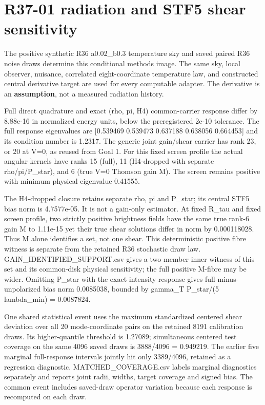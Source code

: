 \documentclass[
]{article}
\author{}
\date{}
\begin{document}
\hypertarget{r37-01-radiation-and-stf5-shear-sensitivity}{%
\section{R37-01 radiation and STF5 shear
sensitivity}\label{r37-01-radiation-and-stf5-shear-sensitivity}}

The positive synthetic R36 a0.02\_b0.3 temperature sky and saved paired
R36 noise draws determine this conditional methods image. The same sky,
local observer, nuisance, correlated eight-coordinate temperature law,
and constructed central derivative target are used for every computable
adapter. The derivative is an \textbf{assumption}, not a measured
radiation history.

Full direct quadrature and exact (rho, pi, H4) common-carrier response
differ by 8.88e-16 in normalized energy units, below the preregistered
2e-10 tolerance. The full response eigenvalues are {[}0.539469 0.539473
0.637188 0.638056 0.664453{]} and its condition number is 1.2317. The
generic joint gain/shear carrier has rank 23, or 20 at V=0, as reused
from Goal 1. For this fixed screen profile the actual angular kernels
have ranks 15 (full), 11 (H4-dropped with separate rho/pi/P\_star), and
6 (true V=0 Thomson gain M). The screen remains positive with minimum
physical eigenvalue 0.41555.

The H4-dropped closure retains separate rho, pi and P\_star; its central
STF5 bias norm is 4.7577e-05. It is not a gain-only estimator. At fixed
R\_tau and fixed screen profile, two strictly positive brightness fields
have the same true rank-6 gain M to 1.11e-15 yet their true shear
solutions differ in norm by 0.000118028. Thus M alone identifies a set,
not one shear. This deterministic positive fibre witness is separate
from the retained R36 stochastic draw law. GAIN\_IDENTIFIED\_SUPPORT.csv
gives a two-member inner witness of this set and its common-disk
physical sensitivity; the full positive M-fibre may be wider. Omitting
P\_star with the exact intensity response gives full-minus-unpolarized
bias norm 0.0085038, bounded by gamma\_T
\textbar\textbar P\_star\textbar\textbar/(5 lambda\_min) = 0.0087824.

One shared statistical event uses the maximum standardized centered
shear deviation over all 20 mode-coordinate pairs on the retained 8191
calibration draws. Its higher-quantile threshold is 1.27089;
simultaneous centered test coverage on the same 4096 saved draws is
3888/4096 = 0.949219. The earlier five marginal full-response intervals
jointly hit only 3389/4096, retained as a regression diagnostic.
MATCHED\_COVERAGE.csv labels marginal diagnostics separately and reports
joint radii, widths, target coverage and signed bias. The common event
includes saved-draw operator variation because each response is
recomputed on each draw.
\end{document}
